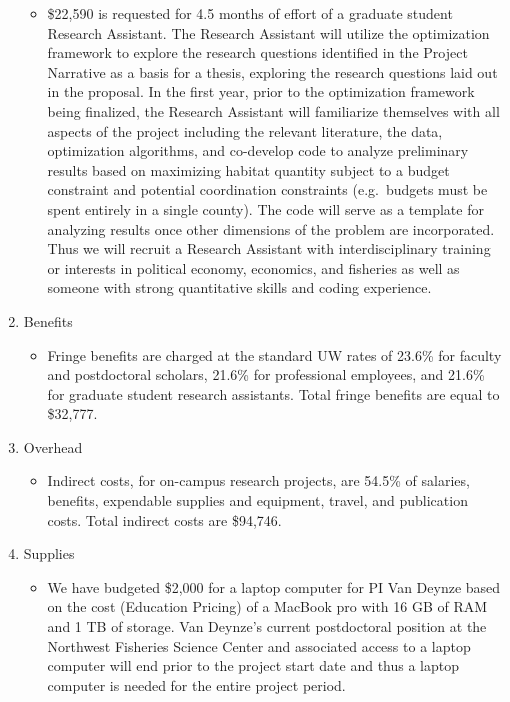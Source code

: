 \begin{enumerate}
\begin{itemize}
\item \$22,590 is requested for 4.5 months of effort of a graduate student Research Assistant. The Research Assistant will utilize the optimization framework to explore the research questions identified in the Project Narrative as a basis for a thesis, exploring the research questions laid out in the proposal. In the first year, prior to the optimization framework being finalized, the Research Assistant will familiarize themselves with all aspects of the project including the relevant literature, the data, optimization algorithms, and co-develop code to analyze preliminary results based on maximizing habitat quantity subject to a budget constraint and potential coordination constraints (e.g.\ budgets must be spent entirely in a single county). The code will serve as a template for analyzing results once other dimensions of the problem are incorporated. Thus we will recruit a Research Assistant with interdisciplinary training or interests in political economy, economics, and fisheries as well as someone with strong quantitative skills and coding experience.
\end{itemize}
\item Benefits
\begin{itemize}
\item Fringe benefits are charged at the standard UW rates of 23.6\% for faculty and postdoctoral scholars, 21.6\% for professional employees, and 21.6\% for graduate student research assistants. Total fringe benefits are equal to \$32,777.
\end{itemize}
\item Overhead
\begin{itemize}
\item Indirect costs, for on-campus research projects, are 54.5\% of salaries, benefits, expendable supplies and equipment, travel, and publication costs. Total indirect costs are \$94,746.
\end{itemize}
\item Supplies
\begin{itemize}
\item We have budgeted \$2,000 for a laptop computer for PI Van Deynze based on the cost (Education Pricing) of a MacBook pro with 16 GB of RAM and 1 TB of storage. Van Deynze's current postdoctoral position at the Northwest Fisheries Science Center and associated access to a laptop computer will end prior to the project start date and thus a laptop computer is needed for the entire project period.
\end{itemize}

\end{enumerate}
